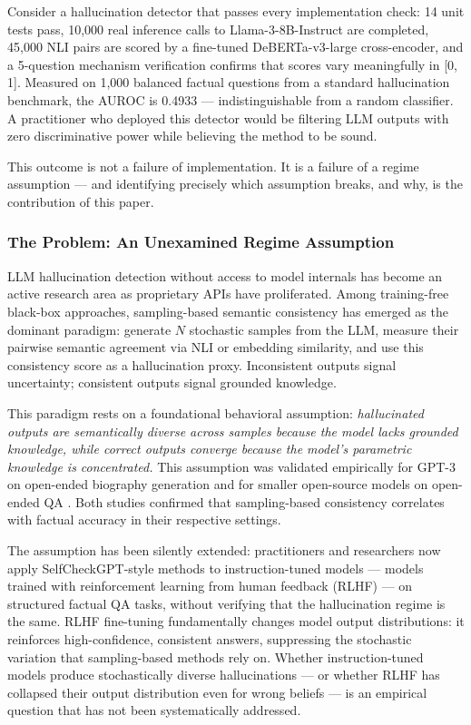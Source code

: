 
Consider a hallucination detector that passes every implementation check: 14 unit tests pass, 10,000 real inference calls to Llama-3-8B-Instruct are completed, 45,000 NLI pairs are scored by a fine-tuned DeBERTa-v3-large cross-encoder, and a 5-question mechanism verification confirms that scores vary meaningfully in [0, 1]. Measured on 1,000 balanced factual questions from a standard hallucination benchmark, the AUROC is 0.4933 --- indistinguishable from a random classifier. A practitioner who deployed this detector would be filtering LLM outputs with zero discriminative power while believing the method to be sound.

This outcome is not a failure of implementation. It is a failure of a regime assumption --- and identifying precisely which assumption breaks, and why, is the contribution of this paper.

\subsubsection{The Problem: An Unexamined Regime Assumption}

LLM hallucination detection without access to model internals has become an active research area as proprietary APIs have proliferated. Among training-free black-box approaches, sampling-based semantic consistency has emerged as the dominant paradigm: generate $N$ stochastic samples from the LLM, measure their pairwise semantic agreement via NLI or embedding similarity, and use this consistency score as a hallucination proxy. Inconsistent outputs signal uncertainty; consistent outputs signal grounded knowledge.

This paradigm rests on a foundational behavioral assumption: \textit{hallucinated outputs are semantically diverse across samples because the model lacks grounded knowledge, while correct outputs converge because the model's parametric knowledge is concentrated.} This assumption was validated empirically for GPT-3 on open-ended biography generation \citep{Manakul2023SelfCheckGPT} and for smaller open-source models on open-ended QA \citep{Kuhn2023Semantic}. Both studies confirmed that sampling-based consistency correlates with factual accuracy in their respective settings.

The assumption has been silently extended: practitioners and researchers now apply SelfCheckGPT-style methods to instruction-tuned models --- models trained with reinforcement learning from human feedback (RLHF) --- on structured factual QA tasks, without verifying that the hallucination regime is the same. RLHF fine-tuning fundamentally changes model output distributions: it reinforces high-confidence, consistent answers, suppressing the stochastic variation that sampling-based methods rely on. Whether instruction-tuned models produce stochastically diverse hallucinations --- or whether RLHF has collapsed their output distribution even for wrong beliefs --- is an empirical question that has not been systematically addressed.

